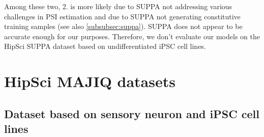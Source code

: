 Among these two, 2. is more likely due to SUPPA not addressing various challenges in PSI estimation and due to SUPPA not generating constitutive training samples (see also \ref{subsubsec:suppa}). SUPPA does not appear to be accurate enough for our purposes. Therefore, we don't evaluate our models on the HipSci SUPPA dataset based on undifferentiated iPSC cell lines.





\section{HipSci MAJIQ datasets} \label{subsec:majiq}

\subsection{Dataset based on sensory neuron and iPSC cell lines}\label{sec:hipsci_neuron_majiq}



